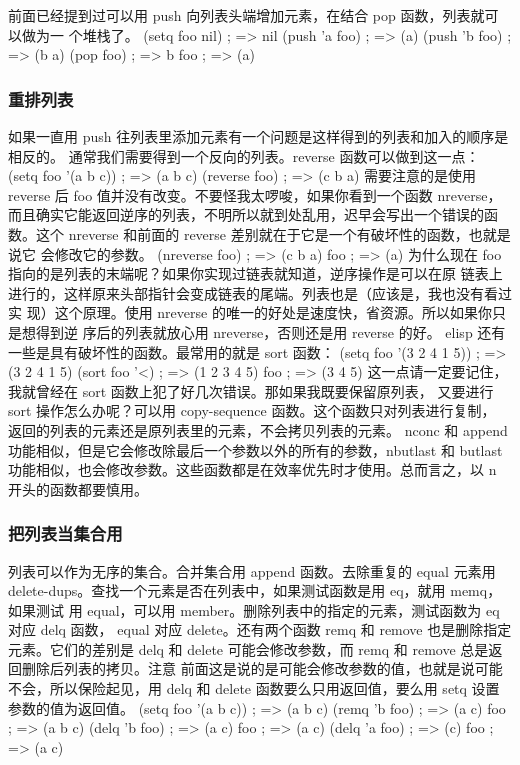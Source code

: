 \documentclass[11pt]{ctexart}
\begin{document}
前面已经提到过可以用 push 向列表头端增加元素，在结合 pop 函数，列表就可以做为一
个堆栈了。
(setq foo nil)                          ; => nil
(push 'a foo)                           ; => (a)
(push 'b foo)                           ; => (b a)
(pop foo)                               ; => b
foo                                     ; => (a)
\subsubsection{重排列表}
\label{sec:orgd09be3c}
如果一直用 push 往列表里添加元素有一个问题是这样得到的列表和加入的顺序是相反的。
通常我们需要得到一个反向的列表。reverse 函数可以做到这一点：
(setq foo '(a b c))                     ; => (a b c)
(reverse foo)                           ; => (c b a)
需要注意的是使用 reverse 后 foo 值并没有改变。不要怪我太啰唆，如果你看到一个函数
nreverse，而且确实它能返回逆序的列表，不明所以就到处乱用，迟早会写出一个错误的函
数。这个 nreverse 和前面的 reverse 差别就在于它是一个有破坏性的函数，也就是说它
会修改它的参数。
(nreverse foo)                          ; => (c b a)
foo                                     ; => (a)
为什么现在 foo 指向的是列表的末端呢？如果你实现过链表就知道，逆序操作是可以在原
链表上进行的，这样原来头部指针会变成链表的尾端。列表也是（应该是，我也没有看过实
现）这个原理。使用 nreverse 的唯一的好处是速度快，省资源。所以如果你只是想得到逆
序后的列表就放心用 nreverse，否则还是用 reverse 的好。
elisp 还有一些是具有破坏性的函数。最常用的就是 sort 函数：
(setq foo '(3 2 4 1 5))                 ; => (3 2 4 1 5)
(sort foo '<)                           ; => (1 2 3 4 5)
foo                                     ; => (3 4 5)
这一点请一定要记住，我就曾经在 sort 函数上犯了好几次错误。那如果我既要保留原列表，
又要进行 sort 操作怎么办呢？可以用 copy-sequence 函数。这个函数只对列表进行复制，
返回的列表的元素还是原列表里的元素，不会拷贝列表的元素。
nconc 和 append 功能相似，但是它会修改除最后一个参数以外的所有的参数，nbutlast 和 butlast 功能相似，也会修改参数。这些函数都是在效率优先时才使用。总而言之，以 n 开头的函数都要慎用。
\subsubsection{把列表当集合用}
\label{sec:org90c18e4}
列表可以作为无序的集合。合并集合用 append 函数。去除重复的 equal 元素用
delete-dups。查找一个元素是否在列表中，如果测试函数是用 eq，就用 memq，如果测试
用 equal，可以用 member。删除列表中的指定的元素，测试函数为 eq 对应 delq 函数，
equal 对应 delete。还有两个函数 remq 和 remove 也是删除指定元素。它们的差别是
delq 和 delete 可能会修改参数，而 remq 和 remove 总是返回删除后列表的拷贝。注意
前面这是说的是可能会修改参数的值，也就是说可能不会，所以保险起见，用 delq 和
delete 函数要么只用返回值，要么用 setq 设置参数的值为返回值。
(setq foo '(a b c))                     ; => (a b c)
(remq 'b foo)                           ; => (a c)
foo                                     ; => (a b c)
(delq 'b foo)                           ; => (a c)
foo                                     ; => (a c)
(delq 'a foo)                           ; => (c)
foo                                     ; => (a c)
\end{document}
